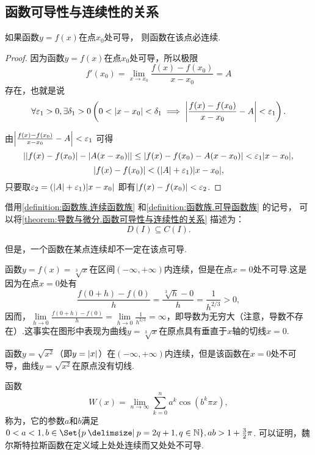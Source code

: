 \subsection{函数可导性与连续性的关系}
\begin{theorem}\label{theorem:导数与微分.函数可导性与连续性的关系}
如果函数\(y = f(x)\)在点\(x_0\)处可导，
则函数在该点必连续.
\begin{proof}
因为函数\(y = f(x)\)在点\(x_0\)处可导，所以极限\[
	f'(x_0) = \lim\limits_{x \to x_0}\frac{f(x)-f(x_0)}{x-x_0} = A
\]存在，也就是说\[
	\forall \varepsilon_1 > 0, \exists \delta_1 > 0 \left(
		0 < \abs{x-x_0} < \delta_1 \implies \abs{\frac{f(x)-f(x_0)}{x-x_0} - A} < \varepsilon_1
	\right).
\]

由\(\abs{\frac{f(x)-f(x_0)}{x-x_0} - A} < \varepsilon_1\)
可得\[
	\abs{\abs{f(x)-f(x_0)} - \abs{A(x-x_0)}}
	\leq \abs{f(x)-f(x_0) - A(x-x_0)}
	< \varepsilon_1 \abs{x-x_0},
\]\[
	\abs{f(x)-f(x_0)} < (\abs{A} + \varepsilon_1) \abs{x-x_0},
\]
只要取\(\varepsilon_2 = (\abs{A} + \varepsilon_1) \abs{x-x_0}\)
即有\(\abs{f(x)-f(x_0)} < \varepsilon_2\).
\end{proof}
\end{theorem}
借用\cref{definition:函数族.连续函数族} 和\cref{definition:函数族.可导函数族} 的记号，
可以将\cref{theorem:导数与微分.函数可导性与连续性的关系} 描述为：\[
	D(I) \subseteq C(I).
\]

但是，一个函数在某点连续却不一定在该点可导.
\begin{example}
函数\(y=f(x)=\sqrt[3]x\)在区间\((-\infty,+\infty)\)内连续，但是在点\(x=0\)处不可导.这是因为在点\(x=0\)处有\[
\frac{f(0+h)-f(0)}{h}
=\frac{\sqrt[3]{h}-0}{h}
=\frac{1}{h^{2/3}}>0,
\]因而，\(\lim\limits_{h\to0}\frac{f(0+h)-f(0)}{h}=\lim\limits_{h\to0}\frac{1}{h^{2/3}}=\infty\)，即导数为无穷大（注意，导数不存在）.这事实在图形中表现为曲线\(y=\sqrt[3]x\)在原点具有垂直于\(x\)轴的切线\(x=0\).
\end{example}

\begin{example}
函数\(y=\sqrt{x^2}\)（即\(y=\abs{x}\)）在\((-\infty,+\infty)\)内连续，但是该函数在\(x=0\)处不可导，曲线\(y=\sqrt{x^2}\)在原点没有切线.
\end{example}

\begin{example}
函数\[
W(x) = \lim\limits_{n\to\infty} \sum\limits_{k=0}^n a^k \cos(b^k \pi x),
\]称为，它的参数\(a\)和\(b\)满足\(0<a<1, b\in\Set{ p \given p = 2q+1, q\in\mathbb{N} }, ab > 1+\frac{3}{2}\pi\).
可以证明，魏尔斯特拉斯函数在定义域上处处连续而又处处不可导.
\end{example}

